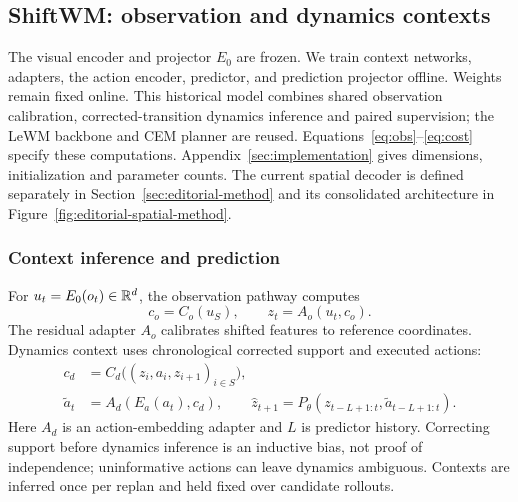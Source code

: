 \subsection{ShiftWM: observation and dynamics contexts}
\label{sec:method}
The visual encoder and projector $E_0$ are frozen. We train context networks,
adapters, the action encoder, predictor, and prediction projector offline.
Weights remain fixed online. This historical model combines shared observation
calibration, corrected-transition dynamics inference and paired supervision;
the LeWM backbone and CEM planner are reused. Equations~\ref{eq:obs}--\ref{eq:cost}
specify these computations. Appendix~\ref{sec:implementation} gives dimensions,
initialization and parameter counts. The current spatial decoder is defined
separately in Section~\ref{sec:editorial-method} and its consolidated
architecture in Figure~\ref{fig:editorial-spatial-method}.

\subsubsection{Context inference and prediction}
For $u_t=E_0(o_t)\in\mathbb{R}^d$, the observation pathway computes
\begin{equation}
 c_o=C_o(u_S),\qquad z_t=A_o(u_t,c_o).
 \label{eq:obs}
\end{equation}
The residual adapter $A_o$ calibrates shifted features to reference
coordinates. Dynamics context uses chronological corrected support and
executed actions:
\begin{align}
 c_d&=C_d\big((z_i,a_i,z_{i+1})_{i\in S}\big),\nonumber\\
 \widetilde a_t&=A_d(E_a(a_t),c_d),\qquad
 \hat z_{t+1}=P_\theta(z_{t-L+1:t},\widetilde a_{t-L+1:t}).
 \label{eq:prediction}
\end{align}
Here $A_d$ is an action-embedding adapter and $L$ is predictor history.
Correcting support before dynamics inference is an inductive bias, not
proof of independence; uninformative actions can leave dynamics ambiguous.
Contexts are inferred once per replan and held fixed over candidate rollouts.

